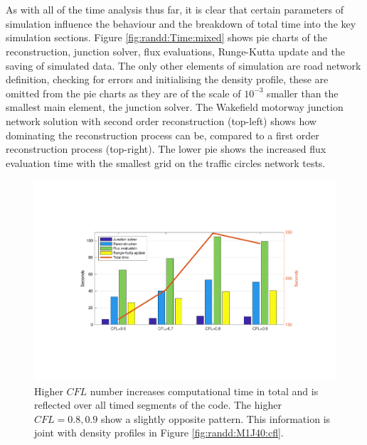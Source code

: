 	\\ \\
	As with all of the time analysis thus far, it is clear that certain parameters of simulation influence the behaviour and the breakdown of total time into the key simulation sections. Figure \ref{fig:randd:Time:mixed} shows pie charts of the reconstruction, junction solver, flux evaluations, Runge-Kutta update and the saving of simulated data. The only other elements of simulation are road network definition, checking for errors and initialising the density profile, these are omitted from the pie charts as they are of the scale of $10^{-3}$ smaller than the smallest main element, the junction solver. The Wakefield motorway junction network solution with second order reconstruction (top-left) shows how dominating the reconstruction process can be, compared to a first order reconstruction process (top-right). The lower pie shows the increased flux evaluation time with the smallest grid on the traffic circles network tests. 

	\begin{figure}
    		\centering
        		\includegraphics[trim=110 120 90 120,clip,width=\textwidth]{Time_M1J40_CFL.pdf}
		\caption[Time Analysis : M1J40 CFL]{Higher $CFL$ number increases computational time in total and is reflected over all timed segments of the code. The higher $CFL=0.8,0.9$ show a slightly opposite pattern. This information is joint with density profiles in Figure \ref{fig:randd:M1J40:cfl}.}
		\label{fig:randd:Time:M1J40_CFL}
	\end{figure}
	
